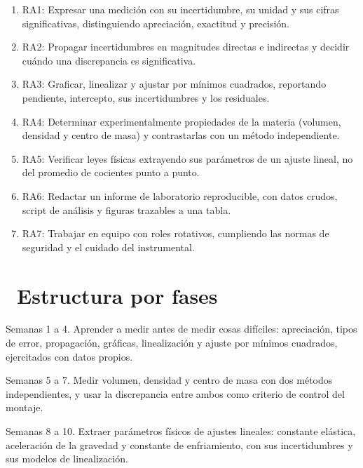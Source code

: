 \documentclass[11pt,a4paper]{article}
\newcommand{\iconotexto}[2]{\textcolor{cyanNeon}{\faIcon{#1}}~#2}
\begin{document}
\begin{enumerate}[leftmargin=1.4em,itemsep=2pt,topsep=3pt]
  \item RA1: Expresar una medición con su incertidumbre, su unidad y sus cifras significativas, distinguiendo apreciación, exactitud y precisión.
  \item RA2: Propagar incertidumbres en magnitudes directas e indirectas y decidir cuándo una discrepancia es significativa.
  \item RA3: Graficar, linealizar y ajustar por mínimos cuadrados, reportando pendiente, intercepto, sus incertidumbres y los residuales.
  \item RA4: Determinar experimentalmente propiedades de la materia (volumen, densidad y centro de masa) y contrastarlas con un método independiente.
  \item RA5: Verificar leyes físicas extrayendo sus parámetros de un ajuste lineal, no del promedio de cocientes punto a punto.
  \item RA6: Redactar un informe de laboratorio reproducible, con datos crudos, script de análisis y figuras trazables a una tabla.
  \item RA7: Trabajar en equipo con roles rotativos, cumpliendo las normas de seguridad y el cuidado del instrumental.
\end{enumerate}

\section{\iconotexto{sitemap}{Estructura por fases}}

\begin{tcolorbox}[cajaContenido,title={Fase 1 --- Medición, error y análisis gráfico}]Semanas 1 a 4. Aprender a medir antes de medir cosas difíciles: apreciación, tipos de error, propagación, gráficas, linealización y ajuste por mínimos cuadrados, ejercitados con datos propios.
\end{tcolorbox}

\begin{tcolorbox}[cajaContenido,title={Fase 2 --- Propiedades de la materia y equilibrio}]Semanas 5 a 7. Medir volumen, densidad y centro de masa con dos métodos independientes, y usar la discrepancia entre ambos como criterio de control del montaje.
\end{tcolorbox}

\begin{tcolorbox}[cajaContenido,title={Fase 3 --- Elasticidad, oscilaciones y calor}]Semanas 8 a 10. Extraer parámetros físicos de ajustes lineales: constante elástica, aceleración de la gravedad y constante de enfriamiento, con sus incertidumbres y sus modelos de linealización.
\end{tcolorbox}
\end{document}

